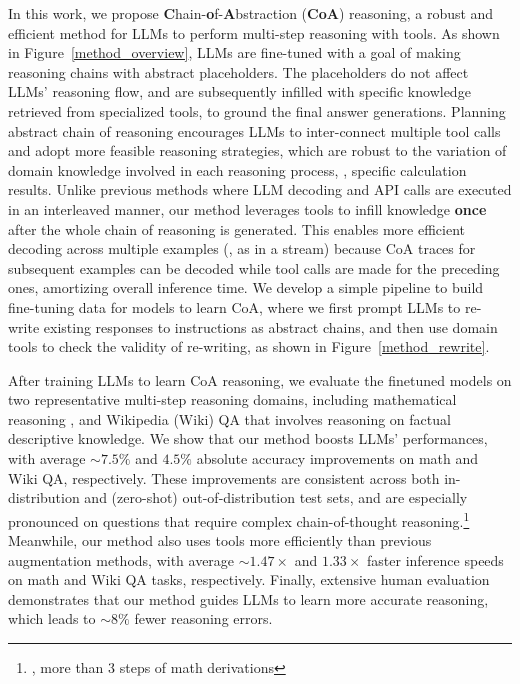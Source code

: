 In this work, we propose \textbf{C}hain-\textbf{o}f-\textbf{A}bstraction (\textbf{CoA}) reasoning, a robust and efficient method for LLMs to perform multi-step reasoning with tools.
As shown in Figure~\ref{method_overview}, LLMs are fine-tuned with a goal of making reasoning chains with abstract placeholders.
The placeholders do not affect LLMs' reasoning flow, and are subsequently infilled with specific knowledge retrieved from specialized tools, to ground the final answer generations.
Planning abstract chain of reasoning encourages LLMs to inter-connect multiple tool calls and adopt more feasible reasoning strategies, which are robust to the variation of domain knowledge involved in each reasoning process, \eg{}, specific calculation results.
Unlike previous methods where LLM decoding and API calls are executed in an interleaved manner, our method leverages tools to infill knowledge \textbf{once} after the whole chain of reasoning is generated.
This enables more efficient decoding across multiple examples (\eg, as in a stream) because CoA traces for subsequent examples can be decoded while tool calls are made for the preceding ones, amortizing overall inference time.
We develop a simple pipeline to build fine-tuning data for models to learn CoA, where we first prompt LLMs to re-write existing responses to instructions as abstract chains, and then use domain tools to check the validity of re-writing, as shown in Figure~\ref{method_rewrite}.

After training LLMs to learn CoA reasoning, we evaluate the finetuned models on two representative multi-step reasoning domains, including mathematical reasoning \citep{cobbe2021training,miao2020diverse,patel2021nlp,koncel2016mawps}, and Wikipedia (Wiki) QA \citep{yang2018hotpotqa,berant2013semantic,kwiatkowski2019natural,joshi2017triviaqa} that involves reasoning on factual descriptive knowledge.
We show that our method boosts LLMs' performances, with average $\sim$$7.5\%$ and $4.5\%$ absolute accuracy improvements on math and Wiki QA, respectively.
These improvements are consistent across both in-distribution
and (zero-shot) out-of-distribution test sets, and are especially pronounced on questions that require complex chain-of-thought reasoning.\footnote{\eg{}, more than 3 steps of math derivations} 
Meanwhile, our method also uses tools more efficiently than previous augmentation methods, with average $\sim$$1.47\times$ and $1.33\times$ faster inference speeds on math and Wiki QA tasks, respectively.
Finally, extensive human evaluation demonstrates that our method guides LLMs to learn more accurate reasoning, which leads to $\sim8\%$ fewer reasoning errors.

